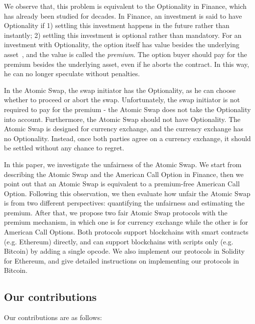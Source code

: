 We observe that, this problem is equivalent to the Optionality in Finance, which has already been studied for decades.
In Finance, an investment is said to have Optionality if
1) settling this investment happens in the future rather than instantly;
2) settling this investment is optional rather than mandatory.
For an investment with Optionality, the option itself has value besides the underlying asset~\cite{higham2004introduction}, and the value is called the \textit{premium}.
The option buyer should pay for the premium besides the underlying asset, even if he aborts the contract.
In this way, he can no longer speculate without penalties.

In the Atomic Swap, the swap initiator has the Optionality, as he can choose whether to proceed or abort the swap.
Unfortunately, the swap initiator is not required to pay for the premium - the Atomic Swap does not take the Optionality into account.
Furthermore, the Atomic Swap should not have Optionality.
The Atomic Swap is designed for currency exchange, and the currency exchange has no Optionality.
Instead, once both parties agree on a currency exchange, it should be settled without any chance to regret.

In this paper, we investigate the unfairness of the Atomic Swap.
We start from describing the Atomic Swap and the American Call Option in Finance,
then we point out that an Atomic Swap is equivalent to a premium-free American Call Option.
Following this observation, we then evaluate how unfair the Atomic Swap is from two different perspectives:
quantifying the unfairness and estimating the premium.
After that, we propose two fair Atomic Swap protocols with the premium mechanism, in which one is for currency exchange while the other is for American Call Options.
Both protocols support blockchains with smart contracts (e.g. Ethereum) directly, and can support blockchains with scripts only (e.g. Bitcoin) by adding a single opcode.
We also implement our protocols in Solidity for Ethereum, and give detailed instructions on implementing our protocols in Bitcoin.

\subsection{Our contributions}

Our contributions are as follows:

